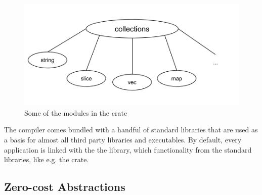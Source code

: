 \begin{figure}[H]
  \begin{center}
    \includegraphics[scale=0.3]{figures/background/rust/libcollections.png}
  \end{center}
  \caption{Some of the modules in the  crate}
  \label{fig:rust:collections}
\end{figure}

The {\rust} compiler comes bundled with a handful of standard libraries that are used as a basis for almost all third party libraries and executables.
By default, every {\rust} application is linked with the the {\rust} {\std} library, which  functionality from the standard libraries, like e.g. the  crate.
%

\subsection{Zero-cost Abstractions}
\label{chap:zero_cost_abstractions}

